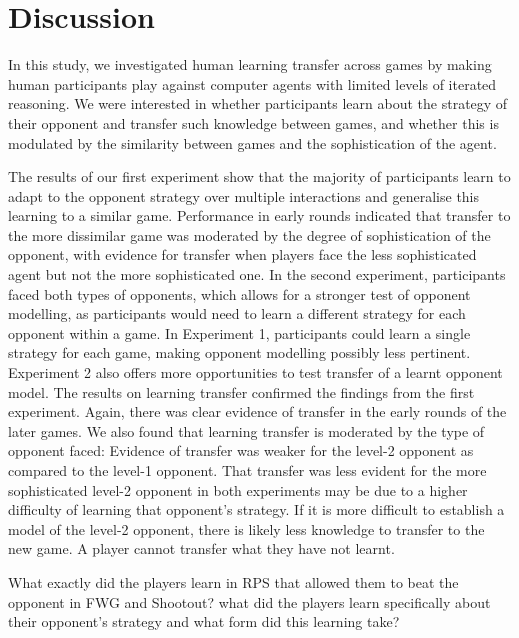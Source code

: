 \documentclass[man,floatsintext]{apa6}
\begin{document}
\hypertarget{discussion-2}{%
\section{Discussion}\label{discussion-2}}

In this study, we investigated human learning transfer across games by making human participants play against computer agents with limited levels of iterated reasoning. We were interested in whether participants learn about the strategy of their opponent and transfer such knowledge between games, and whether this is modulated by the similarity between games and the sophistication of the agent.

The results of our first experiment show that the majority of participants learn to adapt to the opponent strategy over multiple interactions and generalise this learning to a similar game. Performance in early rounds indicated that transfer to the more dissimilar game was moderated by the degree of sophistication of the opponent, with evidence for transfer when players face the less sophisticated agent but not the more sophisticated one. In the second experiment, participants faced both types of opponents, which allows for a stronger test of opponent modelling, as participants would need to learn a different strategy for each opponent within a game. In Experiment 1, participants could learn a single strategy for each game, making opponent modelling possibly less pertinent. Experiment 2 also offers more opportunities to test transfer of a learnt opponent model. The results on learning transfer confirmed the findings from the first experiment. Again, there was clear evidence of transfer in the early rounds of the later games. We also found that learning transfer is moderated by the type of opponent faced: Evidence of transfer was weaker for the level-2 opponent as compared to the level-1 opponent. That transfer was less evident for the more sophisticated level-2 opponent in both experiments may be due to a higher difficulty of learning that opponent's strategy. If it is more difficult to establish a model of the level-2 opponent, there is likely less knowledge to transfer to the new game. A player cannot transfer what they have not learnt.

What exactly did the players learn in RPS that allowed them to beat the opponent in FWG and Shootout? what did the players learn specifically about their opponent's strategy and what form did this learning take?
\end{document}
